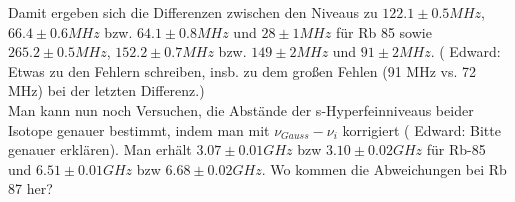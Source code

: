 \documentclass[a4paper,parskip]{scrartcl}
\begin{document}
Damit ergeben sich die Differenzen zwischen den Niveaus zu $122.1 \pm 0.5 MHz$, $66.4 \pm 0.6MHz$ bzw. $64.1 \pm 0.8 MHz$ und $28 \pm 1 MHz$ für Rb 85 sowie $265.2 \pm 0.5 MHz$, $152.2 \pm 0.7 MHz$ bzw. $149 \pm 2 MHz$ und $91 \pm 2 MHz$. ({\color{red} Edward: Etwas zu den Fehlern schreiben, insb. zu dem großen Fehlen (91 MHz vs. 72 MHz) bei der letzten Differenz.})\\

Man  kann nun noch Versuchen, die Abstände der s-Hyperfeinniveaus beider Isotope genauer bestimmt, indem man mit $\nu_{Gauss} - \nu_i$ korrigiert ({\color{red} Edward: Bitte genauer erklären}). Man erhält
$3.07 \pm 0.01 GHz$ bzw $3.10 \pm 0.02 GHz$ für Rb-85 und $6.51 \pm 0.01 GHz$ bzw $6.68 \pm 0.02 GHz$. {\color{red}Wo kommen die Abweichungen bei Rb 87 her?} 
\end{document}
